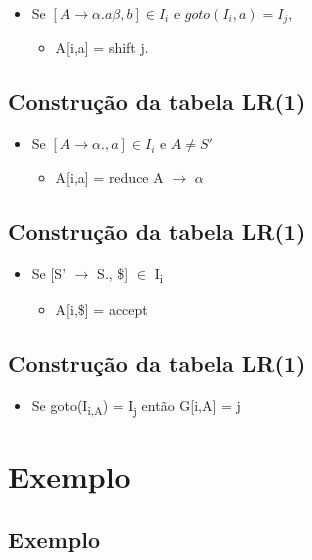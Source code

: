 \documentclass[11pt]{article}
\begin{document}
\begin{itemize}
\item Se \([A \to \alpha .a\beta,b] \in I_i\) e \(goto(I_i,a) = I_j\),
\begin{itemize}
\item A[i,a] = shift j.
\end{itemize}
\end{itemize}
\subsection*{Construção da tabela LR(1)}
\label{sec:orgfe7e447}

\begin{itemize}
\item Se \([A \to \alpha . , a] \in I_i\) e \(A \neq S'\)
\begin{itemize}
\item A[i,a] = reduce A \(\to\) \(\alpha\)
\end{itemize}
\end{itemize}
\subsection*{Construção da tabela LR(1)}
\label{sec:org4c6b260}

\begin{itemize}
\item Se [S' \(\to\) S., \$] \(\in\) I\textsubscript{i}
\begin{itemize}
\item A[i,\$] = accept
\end{itemize}
\end{itemize}
\subsection*{Construção da tabela LR(1)}
\label{sec:org41889fa}

\begin{itemize}
\item Se goto(I\textsubscript{i,A}) = I\textsubscript{j} então G[i,A] = j
\end{itemize}
\section*{Exemplo}
\label{sec:orgc25450d}

\subsection*{Exemplo}
\label{sec:org0dba1c3}
\end{document}
